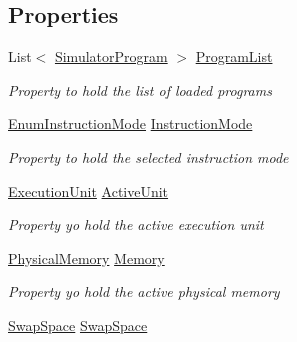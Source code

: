 \subsection*{Properties}
\begin{DoxyCompactItemize}
\item 
List$<$ \hyperlink{class_c_p_u___o_s___simulator_1_1_c_p_u_1_1_simulator_program}{Simulator\+Program} $>$ \hyperlink{class_c_p_u___o_s___simulator_1_1_main_window_a632c91cdd16a7498bbb8dfb3e5df252c}{Program\+List}
\begin{DoxyCompactList}\small\item\em Property to hold the list of loaded programs \end{DoxyCompactList}\item 
\hyperlink{namespace_c_p_u___o_s___simulator_adc17a5a5e004084f05dc8e4d3f70e31f}{Enum\+Instruction\+Mode} \hyperlink{class_c_p_u___o_s___simulator_1_1_main_window_a65916937137002c26f9eb1c88cfff519}{Instruction\+Mode}
\begin{DoxyCompactList}\small\item\em Property to hold the selected instruction mode \end{DoxyCompactList}\item 
\hyperlink{class_c_p_u___o_s___simulator_1_1_c_p_u_1_1_execution_unit}{Execution\+Unit} \hyperlink{class_c_p_u___o_s___simulator_1_1_main_window_a3d03550a73d7ab18ebd143a38dbf1431}{Active\+Unit}
\begin{DoxyCompactList}\small\item\em Property yo hold the active execution unit \end{DoxyCompactList}\item 
\hyperlink{class_c_p_u___o_s___simulator_1_1_memory_1_1_physical_memory}{Physical\+Memory} \hyperlink{class_c_p_u___o_s___simulator_1_1_main_window_abee63f1a7c5feecf97e7253a65806a5a}{Memory}
\begin{DoxyCompactList}\small\item\em Property yo hold the active physical memory \end{DoxyCompactList}\item 
\hyperlink{class_c_p_u___o_s___simulator_1_1_memory_1_1_swap_space}{Swap\+Space} \hyperlink{class_c_p_u___o_s___simulator_1_1_main_window_a114d0bf1ca63b0d9213537758535aecf}{Swap\+Space}

\end{DoxyCompactItemize}
